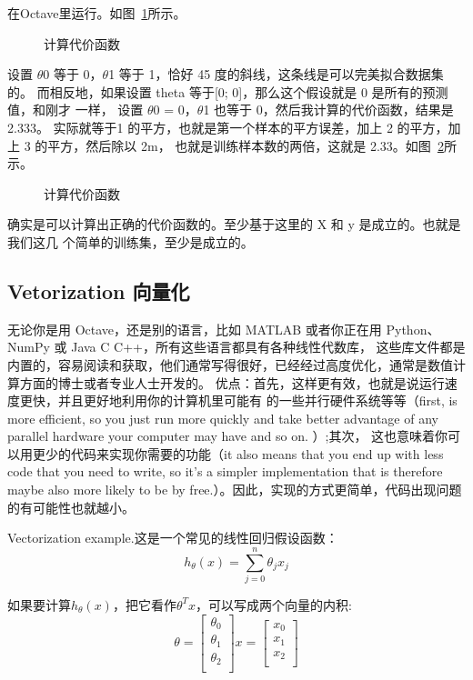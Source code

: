 \documentclass[UTF8]{ctexart}
\begin{document}
在Octave里运行。如图~\ref{fig:40}所示。
\begin{figure}[H]
 \caption{计算代价函数}
 \label{fig:40}
\end{figure}

设置 $\theta$0 等于 0，$\theta$1 等于 1，恰好 45 度的斜线，这条线是可以完美拟合数据集的。
而相反地，如果设置 theta 等于[0; 0]，那么这个假设就是 0 是所有的预测值，和刚才 一样，
设置 $\theta$0 = 0，$\theta$1 也等于 0，然后我计算的代价函数，结果是 2.333。
实际就等于1 的平方，也就是第一个样本的平方误差，加上 2 的平方，加上 3 的平方，然后除以 2m，
也就是训练样本数的两倍，这就是 2.33。如图~\ref{fig:41}所示。
\begin{figure}[H]
 \caption{计算代价函数}
 \label{fig:41}
\end{figure}

确实是可以计算出正确的代价函数的。至少基于这里的 X 和 y 是成立的。也就是我们这几 个简单的训练集，至少是成立的。

\subsection{Vetorization 向量化}
无论你是用 Octave，还是别的语言，比如 MATLAB 或者你正在用 Python、NumPy 或 Java C C++，所有这些语言都具有各种线性代数库，
这些库文件都是内置的，容易阅读和获取，他们通常写得很好，已经经过高度优化，通常是数值计算方面的博士或者专业人士开发的。
优点：首先，这样更有效，也就是说运行速度更快，并且更好地利用你的计算机里可能有 的一些并行硬件系统等等（first, is more efficient,
so you just run more quickly and take better advantage of any parallel hardware your computer may have and so on. ）;其次，
这也意味着你可以用更少的代码来实现你需要的功能（it also means that you end up with less code that you need to write,
so it's a simpler implementation that is therefore maybe also more likely to be by free.）。因此，实现的方式更简单，代码出现问题的有可能性也就越小。

Vectorization example.这是一个常见的线性回归假设函数：
\begin{equation*}
h_{\theta } \left ( x \right )= \sum_{j= 0}^{n}\theta _{j}x_{j}
\end{equation*}

如果要计算$h_{\theta}(x)$，把它看作$\theta^{T}x$，可以写成两个向量的内积:
\begin{equation*}
  \theta=
  \begin{bmatrix}
     \theta_{0} \\
     \theta_{1} \\
     \theta_{2} \\
  \end{bmatrix}
  x=
\begin{bmatrix}
  x_{0} \\
   x_{1} \\
   x_{2} \\
\end{bmatrix}
\end{equation*}
\end{document}
